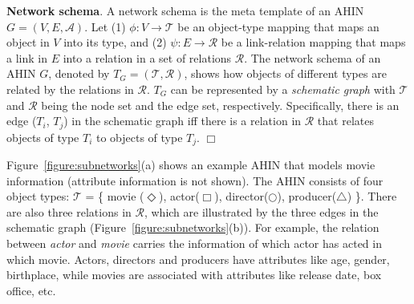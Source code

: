 
\begin{definition}
\textbf{Network schema}. A network schema is the meta template of
an AHIN $G = (V, E, \mathcal{A})$.
Let 
(1) $\phi: V \rightarrow \mathcal{T}$ be an object-type mapping that maps an object in $V$ into its type, and
(2) $\psi: E\rightarrow \mathcal{R}$ be a link-relation mapping that maps a link in $E$ into a relation in a set of 
relations $\mathcal{R}$.
The network schema of an AHIN $G$, denoted by $T_G = (\mathcal{T}, \mathcal{R})$,
shows how objects of different types are related by the relations in $\mathcal{R}$. 
$T_G$ can be represented by a {\it schematic graph} with $\mathcal{T}$ and $\mathcal{R}$ being the node set and the edge set, 
respectively.
Specifically, there is an edge ($T_i$, $T_j$) in the schematic graph iff there is a relation in $\mathcal{R}$ that relates
objects of type $T_i$ to objects of type $T_j$.
\hfill$\Box$
%
%
\end{definition}

Figure~\ref{figure:subnetworks}(a) shows an example AHIN that models movie information 
(attribute information is not shown).
The AHIN consists of four object types: $\mathcal{T}$ = \{
movie ($\Diamond$), actor($\Box$), director($\Circle$), producer($\triangle$) \}.
There are also three relations in $\mathcal{R}$, which are illustrated by the three edges in the schematic
graph (Figure~\ref{figure:subnetworks}(b)). For example, the relation between {\it actor} and {\it movie} 
carries the information of which actor has acted in which movie.
Actors, directors and producers have attributes like age, gender, birthplace, while 
movies are associated with attributes like release date, box office, etc. 


